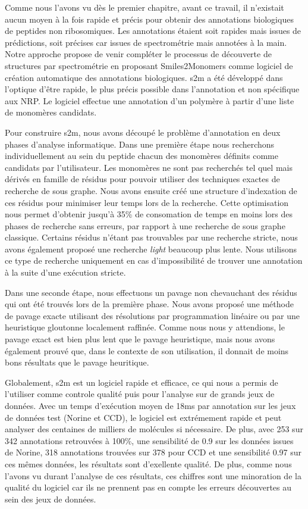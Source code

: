 Comme nous l'avons vu dès le premier chapitre, avant ce travail, il n'existait aucun moyen à la fois rapide et précis pour obtenir des annotations biologiques de peptides non ribosomiques.
Les annotations étaient soit rapides mais issues de prédictions, soit précises car issues de spectrométrie mais annotées à la main.
Notre approche propose de venir compléter le processus de découverte de structures par spectrométrie en proposant Smiles2Monomers comme logiciel de création automatique des annotations biologiques.
s2m a été développé dans l'optique d'être rapide, le plus précis possible dans l'annotation et non spécifique aux NRP.
Le logiciel effectue une annotation d'un polymère à partir d'une liste de monomères candidats.

Pour construire s2m, nous avons découpé le problème d'annotation en deux phases d'analyse informatique.
Dans une première étape nous recherchons individuellement au sein du peptide chacun des monomères définits comme candidats par l'utilisateur.
Les monomères ne sont pas recherchés tel quel mais dérivés en famille de résidus pour pouvoir utiliser des techniques exactes de recherche de sous graphe.
Nous avons ensuite créé une structure d'indexation de ces résidus pour minimiser leur temps lors de la recherche.
Cette optimisation nous permet d'obtenir jusqu'à 35\% de consomation de temps en moins lors des phases de recherche sans erreurs, par rapport à une recherche de sous graphe classique.
Certains résidus n'étant pas trouvables par une recherche stricte, nous avons également proposé une recherche \textit{light} beaucoup plus lente. Nous utilisons ce type de recherche uniquement en cas d'impossibilité de trouver une annotation à la suite d'une exécution stricte.

Dans une seconde étape, nous effectuons un pavage non chevauchant des résidus qui ont été trouvés lors de la première phase.
Nous avons proposé une méthode de pavage exacte utilisant des résolutions par programmation linéaire ou par une heuristique gloutonne localement raffinée.
Comme nous nous y attendions, le pavage exact est bien plus lent que le pavage heuristique, mais nous avons également prouvé que, dans le contexte de son utilisation, il donnait de moins bons résultats que le pavage heuritique.

Globalement, s2m est un logiciel rapide et efficace, ce qui nous a permis de l'utiliser comme controle qualité puis pour l'analyse sur de grands jeux de données.
Avec un temps d'exécution moyen de 18ms par annotation sur les jeux de données test (Norine et CCD), le logiciel est extrémement rapide et peut analyser des centaines de milliers de molécules si nécessaire.
De plus, avec 253 sur 342 annotations retrouvées à 100\%, une sensibilité de 0.9 sur les données issues de Norine, 318 annotations trouvées sur 378 pour CCD et une sensibilité 0.97 sur ces mêmes données, les résultats sont d'exellente qualité.
De plus, comme nous l'avons vu durant l'analyse de ces résultats, ces chiffres sont une minoration de la qualité du logiciel car ils ne prennent pas en compte les erreurs découvertes au sein des jeux de données.


